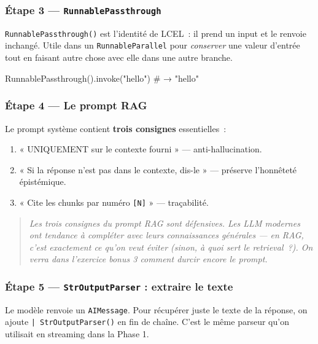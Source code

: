 \documentclass[11pt,a4paper]{article}
\begin{document}
\subsubsection*{Étape 3 — \texttt{RunnablePassthrough}}

\texttt{RunnablePassthrough()} est l'identité de LCEL~: il prend un input
et le renvoie inchangé. Utile dans un \texttt{RunnableParallel} pour
\emph{conserver} une valeur d'entrée tout en faisant autre chose avec
elle dans une autre branche.

\begin{pythoncode}
RunnablePassthrough().invoke("hello")   # → "hello"
\end{pythoncode}

\subsubsection*{Étape 4 — Le prompt RAG}

Le prompt système contient \textbf{trois consignes} essentielles~:

\begin{enumerate}[leftmargin=*]
  \item « UNIQUEMENT sur le contexte fourni » — anti-hallucination.
  \item « Si la réponse n'est pas dans le contexte, dis-le » — préserve
        l'honnêteté épistémique.
  \item « Cite les chunks par numéro \texttt{[N]} » — traçabilité.
\end{enumerate}

\begin{quote}\itshape
Les trois consignes du prompt RAG sont \emph{défensives}. Les LLM
modernes ont tendance à compléter avec leurs connaissances générales —
en RAG, c'est exactement ce qu'on veut éviter (sinon, à quoi sert le
retrieval~?). On verra dans l'exercice bonus 3 comment durcir encore
le prompt.
\end{quote}

\subsubsection*{Étape 5 — \texttt{StrOutputParser} : extraire le texte}

Le modèle renvoie un \texttt{AIMessage}. Pour récupérer juste le texte
de la réponse, on ajoute \texttt{| StrOutputParser()} en fin de chaîne.
C'est le même parseur qu'on utilisait en streaming dans la Phase 1.
\end{document}
